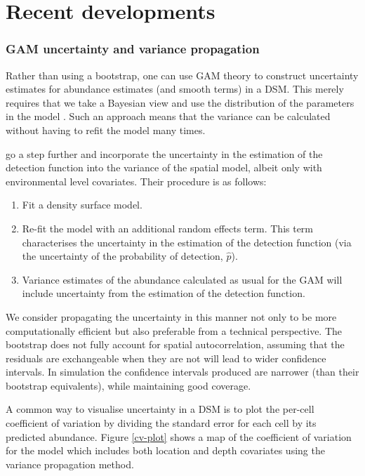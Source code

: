 \documentclass[a4paper,12pt]{article}
\begin{document}
\section*{Recent developments}
\label{s:recentadvances}

\subsubsection*{GAM uncertainty and variance propagation}

Rather than using a bootstrap, one can use GAM theory to construct uncertainty estimates for abundance estimates (and smooth terms) in a DSM. This merely requires that we take a Bayesian view and use the distribution of the parameters in the model \citep[further information can found in][page 245]{Wood:2006wz}. Such an approach means that the variance can be calculated without having to refit the model many times.
 
\cite{WILLIAMS:2011in} go a step further and incorporate the uncertainty in the estimation of the detection function into the variance of the spatial model, albeit only with environmental level covariates. Their procedure is as follows:
\begin{enumerate}
\item Fit a density surface model.
\item Re-fit the model with an additional random effects term. This term characterises the uncertainty in the estimation of the detection function (via the uncertainty of the probability of detection, $\hat{p}$).
\item Variance estimates of the abundance calculated as usual for the GAM will include uncertainty from the estimation of the detection function.
\end{enumerate}
We consider propagating the uncertainty in this manner not only to be more computationally efficient but also preferable from a technical perspective. The bootstrap does not fully account for spatial autocorrelation, assuming that the residuals are exchangeable when they are not will lead to wider confidence intervals. In simulation  the confidence intervals produced are narrower (than their bootstrap equivalents), while maintaining good coverage.

A common way to visualise uncertainty in a DSM is to plot the per-cell coefficient of variation by dividing the standard error for each cell by its predicted abundance. Figure \ref{cv-plot} shows a map of the coefficient of variation for the model which includes both location and depth covariates using the variance propagation method. 
\end{document}
